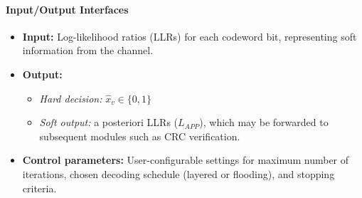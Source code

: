 \documentclass[../main.tex]{subfiles}
\begin{document}
\paragraph{Input/Output Interfaces}
\begin{itemize}
    \item \textbf{Input:} Log-likelihood ratios (LLRs) for each codeword bit, representing soft information from the channel.
    \item \textbf{Output:} 
    \begin{itemize}
        \item \emph{Hard decision:} $\hat{x}_v \in \{0,1\}$
        \item \emph{Soft output:} a posteriori LLRs ($L_{APP}$), which may be forwarded to subsequent modules such as CRC verification.
    \end{itemize}
    \item \textbf{Control parameters:} User-configurable settings for maximum number of iterations, chosen decoding schedule (layered or flooding), and stopping criteria.
\end{itemize}
\end{document}
